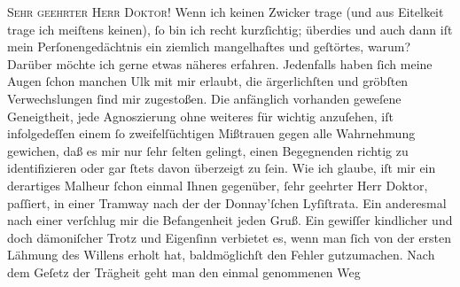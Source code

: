 \pstart{}\textsc{Sehr geehrter Herr Doktor!}\pend\vspace{0.5em}
\pstart
           Wenn ich keinen Zwicker trage (und aus Eitelkeit trage ich meiſtens keinen), ſo bin
               ich recht kurzſichtig; überdies und auch dann iſt mein Perſonengedächtnis ein
               ziemlich mangelhaftes und geſtörtes, warum? Darüber möchte ich gerne etwas näheres
               erfahren. Jedenfalls haben ſich meine Augen ſchon manchen Ulk mit mir erlaubt, die
               ärgerlichſten und gröbſten Verwechslungen ſind mir zugestoßen. Die anfänglich
               vorhanden geweſene Geneigtheit, jede Agnoszierung ohne weiteres für wichtig
               anzuſehen, iſt infolgedeſſen einem ſo zweifelſüchtigen Mißtrauen gegen alle
               Wahrnehmung gewichen, daß es mir nur ſehr ſelten gelingt, einen Begegnenden richtig
               zu identifizieren oder gar ſtets davon überzeigt zu ſein. Wie ich glaube, iſt mir ein
               derartiges Malheur ſchon einmal Ihnen gegenüber, ſehr geehrter \introOben{}Herr\introOben{} Doktor, paſſiert, in einer Tramway nach der \label{K_L01840-1v}\label{K_L01840-1}
               der Donnay’ſchen {\pb}Lyſiſtrata. Ein anderesmal nach einer \label{K_L01840-2v}\label{K_L01840-2} verſchlug mir die Befangenheit jeden
               Gruß. Ein gewiſſer kindlicher und doch dämoniſcher Trotz und Eigenſinn verbietet es,
               wenn man ſich von der ersten Lähmung des Willens erholt hat, baldmöglichſt den Fehler
               gutzumachen. Nach dem Geſetz der Trägheit geht man den einmal genommenen Weg
